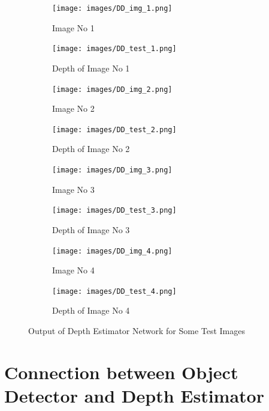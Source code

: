 \documentclass[a4paper, openany]{book}
\begin{document}
\begin{figure}[ht]
  \centering
  \begin{subfigure}[b]{0.3\linewidth}
    \texttt{[image: images/DD\_img\_1.png]}
    \caption{Image No 1}
  \end{subfigure}
  \begin{subfigure}[b]{0.3\linewidth}
    \texttt{[image: images/DD\_test\_1.png]}
    \caption{Depth of Image No 1}
  \end{subfigure}
  
    \begin{subfigure}[b]{0.3\linewidth}
    \texttt{[image: images/DD\_img\_2.png]}
    \caption{Image No 2}
  \end{subfigure}
  \begin{subfigure}[b]{0.3\linewidth}
    \texttt{[image: images/DD\_test\_2.png]}
    \caption{Depth of  Image No 2}
  \end{subfigure}
  
  \begin{subfigure}[b]{0.3\linewidth}
    \texttt{[image: images/DD\_img\_3.png]}
    \caption{Image No 3}
  \end{subfigure}
    \begin{subfigure}[b]{0.3\linewidth}
    \texttt{[image: images/DD\_test\_3.png]}
    \caption{Depth of Image No 3}
  \end{subfigure}
  
  \begin{subfigure}[b]{0.3\linewidth}
    \texttt{[image: images/DD\_img\_4.png]}
    \caption{Image No 4}
  \end{subfigure}
  \begin{subfigure}[b]{0.3\linewidth}
    \texttt{[image: images/DD\_test\_4.png]}
    \caption{Depth of Image No 4}
  \end{subfigure}
  
  \caption{Output of Depth Estimator Network for Some Test Images}
  \label{fig:DD_t_images}
\end{figure}

\newpage
	
\section{Connection between Object Detector and Depth Estimator}
	\vspace{0.3cm}
\end{document}
